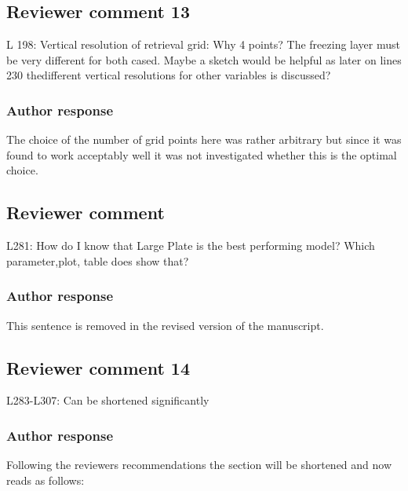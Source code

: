 \documentclass[11pt]{scrartcl}
\begin{document}
\subsection*{Reviewer comment 13}

L 198:  Vertical resolution of retrieval grid:  Why 4 points?  The freezing layer must be very different for both cased. Maybe a sketch would be helpful as later on lines 230 thedifferent vertical resolutions for other variables is discussed?

\subsubsection*{Author response}

The choice of the number of grid points here was rather arbitrary but since it
was found to work acceptably well it was not investigated whether this is the
optimal choice.


\subsection{Reviewer comment}
L281: How do I know that Large Plate is the best performing model? Which parameter,plot, table does show that?

\subsubsection*{Author response}

This sentence is removed in the revised version of the manuscript.



\subsection*{Reviewer comment 14}
L283-L307: Can be shortened significantly

\subsubsection*{Author response}

Following the reviewers recommendations the section will be shortened and
now  reads as follows:
\end{document}
